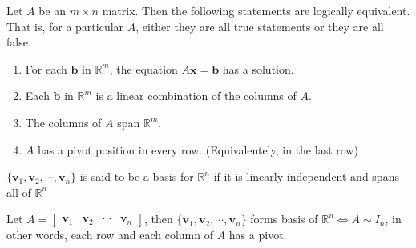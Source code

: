 \documentclass{beamer}
\theoremstyle{definition}
\theoremstyle{remark}
\begin{document}
\begin{frame}[t]
\begin{theorem}\label{16:05-06/06/2022}
Let $A$ be an $m\times n$ matrix. Then the following statements are logically equivalent. That is, for a particular $A$, either they are all true statements or they are all false.
\begin{enumerate}
\item For each $\mathbf b$ in $\mathbb R^m$, the equation $A\mathbf x =\mathbf b$ has a solution.
\item Each $\mathbf b$ in $\mathbb R^m$ is a linear combination of the columns of $A$.
\item The columns of $A$ span $\mathbb R^m$.
\item $A$ has a pivot position in every row. (Equivalentely, in the last row)
\end{enumerate}
\end{theorem}
\end{frame}

\begin{frame}[t]
\begin{definition}
$\{\mathbf v_1,\mathbf v_2,\cdots,\mathbf v_n\}$ is said to be a basis for $\mathbb R^n$ if it is linearly independent and spans all of $\mathbb R^n$
\end{definition}
\pause
\begin{theorem}
Let $A=\begin{bmatrix}
\mathbf v_1&\mathbf v_2&\cdots&\mathbf v_n
\end{bmatrix}$, then $\{\mathbf v_1,\mathbf v_2,\cdots,\mathbf v_n\}$ forms basis of $\mathbb R^n\iff A\sim I_n$, in other words, each row and each column of $A$ has a pivot.
\end{theorem}
\end{frame}
\end{document}
